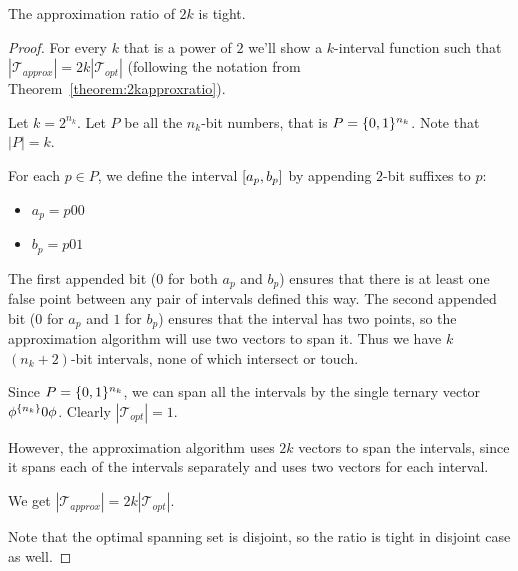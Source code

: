 \begin{theorem}
The approximation ratio of $2k$ is tight.
\end{theorem}

\begin{proof}
For every $k$ that is a power of $2$
we'll show a $k$-interval function such that
$|\mathcal{T}_{approx}| = 2k |\mathcal{T}_{opt}|$
(following the notation from
Theorem~\ref{theorem:2kapproxratio}).

Let $k = 2^{n_k}$.
Let $P$ be all the $n_k$-bit numbers,
that is $P = \{0, 1\}^{n_k}$.
Note that $|P| = k$.

For each $p \in P$,
we define the interval $[a_p, b_p]$
by appending $2$-bit suffixes to $p$:

\begin{itemize}
\item $a_p = p 0 0$
\item $b_p = p 0 1$
\end{itemize}

The first appended bit ($0$ for both $a_p$ and $b_p$)
ensures that there is at least one false point
between any pair of intervals defined this way.
The second appended bit ($0$ for $a_p$ and $1$ for $b_p$)
ensures that the interval has two points,
so the approximation algorithm will use two vectors
to span it.
Thus we have $k$ $(n_k + 2)$-bit intervals,
none of which intersect or touch.

Since $P = \{0, 1\}^{n_k}$,
we can span all the intervals by the single ternary vector
$\phi^{\{n_k\}} 0 \phi$.
Clearly $|\mathcal{T}_{opt}| = 1$.

However,
the approximation algorithm uses $2k$ vectors to span
the intervals,
since it spans each of the intervals separately
and uses two vectors for each interval.

We get
$|\mathcal{T}_{approx}| = 2k |\mathcal{T}_{opt}|$.

Note that the optimal spanning set is disjoint,
so the ratio is tight in disjoint case as well.
\end{proof}
